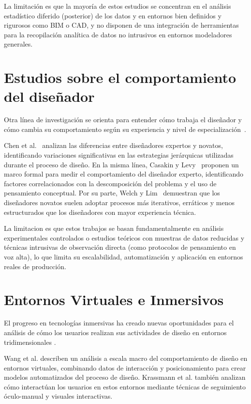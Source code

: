 La limitación es que la mayoría de estos estudios se concentran en el análisis estadístico diferido (posterior) de los datos y en entornos bien definidos y rigurosos como BIM o CAD, y no disponen de una integración de herramientas para la recopilación analítica de datos no intrusivos en entornos modeladores generales.

\section{Estudios sobre el comportamiento del diseñador}

Otra línea de investigación se orienta para entender cómo trabaja el diseñador y cómo cambia su comportamiento según su experiencia y nivel de especialización~\cite{welch,chen2022,casakin2023}.

Chen et al.~\cite{chen2022} analizan las diferencias entre diseñadores expertos y novatos, identificando variaciones significativas en las estrategias jerárquicas utilizadas durante el proceso de diseño. En la misma línea, Casakin y Levy~\cite{casakin2023} proponen un marco formal para medir el comportamiento del diseñador experto, identificando factores correlacionados con la descomposición del problema y el uso de pensamiento conceptual. Por su parte, Welch y Lim~\cite{welch} demuestran que los diseñadores novatos suelen adoptar procesos más iterativos, erráticos y menos estructurados que los diseñadores con mayor experiencia técnica.

La limitacion es que estos trabajos se basan fundamentalmente en análisis experimentales controlados o estudios teóricos con muestras de datos reducidas y técnicas intrusivas de observación directa (como protocolos de pensamiento en voz alta), lo que limita su escalabilidad, automatización y aplicación en entornos reales de producción.

\section{Entornos Virtuales e Inmersivos}

El progreso en tecnologías inmersivas ha creado nuevas oportunidades para el análisis de cómo los usuarios realizan sus actividades de diseño en entornos tridimensionales \cite{krassmann2018,wang2024}.

Wang et al. \cite{wang2024} describen un análisis a escala macro del comportamiento de diseño en entornos virtuales, combinando datos de interacción y posicionamiento para crear modelos automatizados del proceso de diseño. Krassmann et al. \cite{krassmann2018} también analizan cómo interactúan los usuarios en estos entornos mediante técnicas de seguimiento óculo-manual y visuales interactivas.

